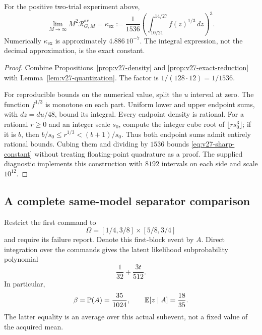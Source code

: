 \begin{theorem}
\label{thm:v27-sharp-constant}
For the positive two-trial experiment above,
\begin{equation}\label{eq:v27-sharp-constant}
 \lim_{M\to\infty}M^2\mathcal R^{\mathrm{av}}_{G,M}
     =\kappa_{\mathrm{ex}}:=
       \frac1{1536}\left(\int_{10/21}^{14/27}f(z)^{1/3}\,dz\right)^3.
\end{equation}
Numerically $\kappa_{\mathrm{ex}}$ is approximately $4.886\,10^{-7}$. The integral expression, not the decimal approximation, is the exact constant.
\end{theorem}
\begin{proof}
Combine Propositions~\ref{prop:v27-density} and \ref{prop:v27-exact-reduction} with Lemma~\ref{lem:v27-quantization}. The factor is $1/(128\cdot12)=1/1536$.

For reproducible bounds on the numerical value, split the $u$ interval at zero. The function $f^{1/3}$ is monotone on each part. Uniform lower and upper endpoint sums, with $dz=du/48$, bound its integral. Every endpoint density is rational. For a rational $r\ge0$ and an integer scale $s_0$, compute the integer cube root of $\lfloor r s_0^3\rfloor$; if it is $b$, then $b/s_0\le r^{1/3}<(b+1)/s_0$. Thus both endpoint sums admit entirely rational bounds. Cubing them and dividing by $1536$ bounds \eqref{eq:v27-sharp-constant} without treating floating-point quadrature as a proof. The supplied diagnostic implements this construction with $8192$ intervals on each side and scale $10^{12}$.
\end{proof}

\subsection{A complete same-model separator comparison}
Restrict the first command to
\[
          \Omega=[1/4,3/8]\times[5/8,3/4]
\]
and require its failure report. Denote this first-block event by $A$. Direct integration over the commands gives the latent likelihood subprobability polynomial
\[
                  \frac1{32}+\frac{3t}{512}.
\]
In particular,
\begin{equation}\label{eq:v27-beta}
 \beta=\mathbb P(A)=\frac{35}{1024},\qquad
 \mathbb E[z\mid A]=\frac{18}{35}.
\end{equation}
The latter equality is an average over this actual subevent, not a fixed value of the acquired mean.

